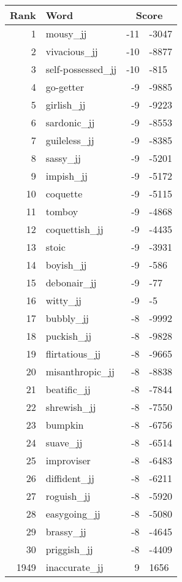 \begin{longtable}[!htbp]{| rlr@{.}l |}
    \hline
    \textbf{Rank} & \textbf{Word} & \multicolumn{2}{c|}{\textbf{Score}} \\
    \hline
    \endhead
    1 & mousy\_jj & -11 & -3047 \\
    2 & vivacious\_jj & -10 & -8877 \\
    3 & self-possessed\_jj & -10 & -815 \\
    4 & go-getter & -9 & -9885 \\
    5 & girlish\_jj & -9 & -9223 \\
    6 & sardonic\_jj & -9 & -8553 \\
    7 & guileless\_jj & -9 & -8385 \\
    8 & sassy\_jj & -9 & -5201 \\
    9 & impish\_jj & -9 & -5172 \\
    10 & coquette & -9 & -5115 \\
    11 & tomboy & -9 & -4868 \\
    12 & coquettish\_jj & -9 & -4435 \\
    13 & stoic & -9 & -3931 \\
    14 & boyish\_jj & -9 & -586 \\
    15 & debonair\_jj & -9 & -77 \\
    16 & witty\_jj & -9 & -5 \\
    17 & bubbly\_jj & -8 & -9992 \\
    18 & puckish\_jj & -8 & -9828 \\
    19 & flirtatious\_jj & -8 & -9665 \\
    20 & misanthropic\_jj & -8 & -8838 \\
    21 & beatific\_jj & -8 & -7844 \\
    22 & shrewish\_jj & -8 & -7550 \\
    23 & bumpkin & -8 & -6756 \\
    24 & suave\_jj & -8 & -6514 \\
    25 & improviser & -8 & -6483 \\
    26 & diffident\_jj & -8 & -6211 \\
    27 & roguish\_jj & -8 & -5920 \\
    28 & easygoing\_jj & -8 & -5080 \\
    29 & brassy\_jj & -8 & -4645 \\
    30 & priggish\_jj & -8 & -4409 \\
    1949 & inaccurate\_jj & 9 & 1656 \\

\end{longtable}
